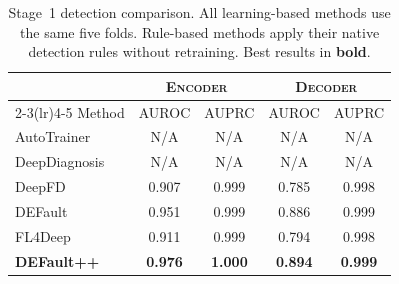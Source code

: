 \begin{table}[!htbp]
\centering
\caption{Stage~1 detection comparison. All learning-based methods use the same five folds. Rule-based methods apply their native detection rules without retraining. Best results in \textbf{bold}.}
\label{tab:baseline_detection}
\small
\setlength{\tabcolsep}{3.5pt}
\begin{tabular}{l cc cc}
\toprule
& \multicolumn{2}{c}{\textsc{Encoder}} & \multicolumn{2}{c}{\textsc{Decoder}} \\
\cmidrule(lr){2-3}\cmidrule(lr){4-5}
Method & AUROC & AUPRC & AUROC & AUPRC \\
\midrule
AutoTrainer~\cite{autotrainer} & N/A & N/A & N/A & N/A \\
DeepDiagnosis~\cite{deepdiagnosis} & N/A & N/A & N/A & N/A \\
DeepFD~\cite{deepfd} & 0.907 & 0.999 & 0.785 & 0.998 \\
DEFault~\cite{default} & 0.951 & 0.999 & 0.886 & 0.999 \\
FL4Deep~\cite{fl4deep} & 0.911 & 0.999 & 0.794 & 0.998 \\
\midrule
\textbf{DEFault++} & \textbf{0.976} & \textbf{1.000} & \textbf{0.894} & \textbf{0.999} \\
\bottomrule
\end{tabular}
\end{table}

